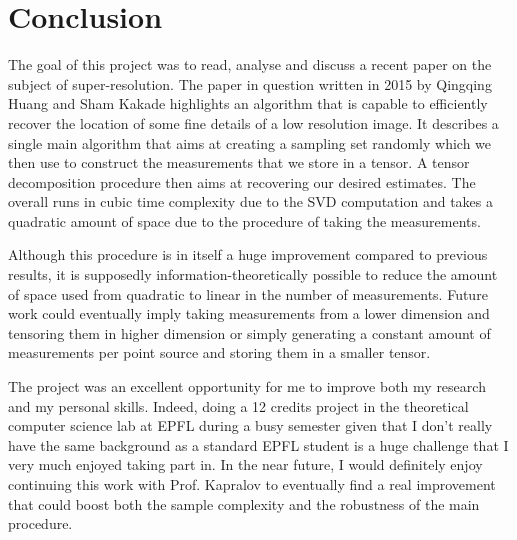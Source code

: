 \chapter{Conclusion}
The goal of this project was to read, analyse and discuss a recent paper on the subject of super-resolution. The paper in question written in 2015 by Qingqing Huang and Sham Kakade highlights an algorithm that is capable to efficiently recover the location of some fine details of a low resolution image. It describes a single main algorithm that aims at creating a sampling set randomly which we then use to construct the measurements that we store in a tensor. A tensor decomposition procedure then aims at recovering our desired estimates. The overall runs in cubic time complexity due to the SVD computation and takes a quadratic amount of space due to the procedure of taking the measurements.\par

Although this procedure is in itself a huge improvement compared to previous results, it is supposedly information-theoretically possible to reduce the amount of space used from quadratic to linear in the number of measurements. Future work could eventually imply taking measurements from a lower dimension and tensoring them in higher dimension or simply generating a constant amount of measurements per point source and storing them in a smaller tensor.\par

The project was an excellent opportunity for me to improve both my research and my personal skills. Indeed, doing a 12 credits project in the theoretical computer science lab at EPFL during a busy semester given that I don't really have the same background as a standard EPFL student is a huge challenge that I very much enjoyed taking part in. In the near future, I would definitely enjoy continuing this work with Prof. Kapralov to eventually find a real improvement that could boost both the sample complexity and the robustness of the main procedure.